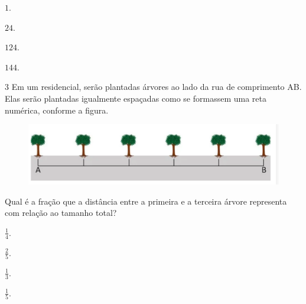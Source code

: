 \begin{multicols}{2}
\begin{escolha}
\item $1$.
\item $24$.
\item $124$.
\item $144$.
\end{escolha}
\end{multicols}



\num{3}  Em um residencial, serão plantadas árvores ao lado da rua de comprimento AB.
Elas serão plantadas igualmente espaçadas como se formassem uma reta
numérica, conforme a figura.

\begin{figure}[H]
\centering\includegraphics[width=\textwidth]{./imgSAEB_6_MAT/media/image109.png}
\end{figure}

Qual é a fração que a distância entre a primeira e a terceira árvore
representa com relação ao tamanho total?

\begin{multicols}{2}
\begin{escolha}
\item $\frac{1}{4}$.
\item $\frac{2}{5}$.
\item $\frac{1}{3}$.
\item $\frac{1}{5}$.
\end{escolha}
\end{multicols}

